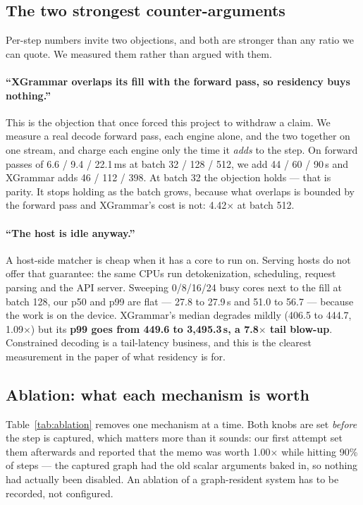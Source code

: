 \documentclass{article}
\begin{document}
\subsection{The two strongest counter-arguments}
\label{sec:eval-counter}

Per-step numbers invite two objections, and both are stronger than any ratio we
can quote. We measured them rather than argued with them.

\paragraph{``XGrammar overlaps its fill with the forward pass, so residency buys
nothing.''} This is the objection that once forced this project to withdraw a
claim. We measure a real decode forward pass, each engine alone, and the two
together on one stream, and charge each engine only the time it \emph{adds} to
the step. On forward passes of 6.6 / 9.4 / 22.1\,ms at batch 32 / 128 / 512, we
add 44 / 60 / 90\,\textmu{}s and XGrammar adds 46 / 112 / 398. At batch 32 the
objection holds --- that is parity. It stops holding as the batch grows, because
what overlaps is bounded by the forward pass and XGrammar's cost is not:
4.42$\times$ at batch 512.

\paragraph{``The host is idle anyway.''} A host-side matcher is cheap when it
has a core to run on. Serving hosts do not offer that guarantee: the same CPUs
run detokenization, scheduling, request parsing and the API server. Sweeping 0/8/16/24 busy cores next to the fill at batch 128, our p50 and p99
are flat --- 27.8 to 27.9\,\textmu{}s and 51.0 to 56.7 --- because the work is
on the device. XGrammar's median degrades mildly (406.5 to 444.7,
1.09$\times$) but its \textbf{p99 goes from 449.6 to 3{,}495.3\,\textmu{}s, a
7.8$\times$ tail blow-up}. Constrained decoding is a tail-latency business, and
this is the clearest measurement in the paper of what residency is for.

\subsection{Ablation: what each mechanism is worth}
\label{sec:eval-ablation}

Table~\ref{tab:ablation} removes one mechanism at a time. Both knobs are set
\emph{before} the step is captured, which matters more than it sounds: our
first attempt set them afterwards and reported that the memo was worth
1.00$\times$ while hitting 90\% of steps --- the captured graph had the old
scalar arguments baked in, so nothing had actually been disabled. An ablation
of a graph-resident system has to be recorded, not configured.
\end{document}

